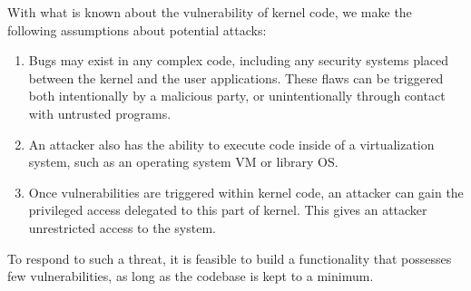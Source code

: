 
With what is known about the vulnerability of kernel code, we make the
following assumptions about potential attacks:

\begin{enumerate}
\item  Bugs may exist in any complex code, including any security systems
placed between the kernel and the user applications. These flaws can be triggered
both intentionally by a malicious party, or unintentionally through contact with
untrusted programs.

\item An attacker also has the ability to execute code inside
of a virtualization system, such as an operating system VM or library OS.

\item Once vulnerabilities are triggered within kernel code, an attacker can gain the
privileged access delegated to this part of kernel. This gives an attacker unrestricted
access to the system.

\end{enumerate}

To respond to such a threat, it is feasible to build a functionality that
possesses few vulnerabilities, as long as the codebase is kept to a minimum.

